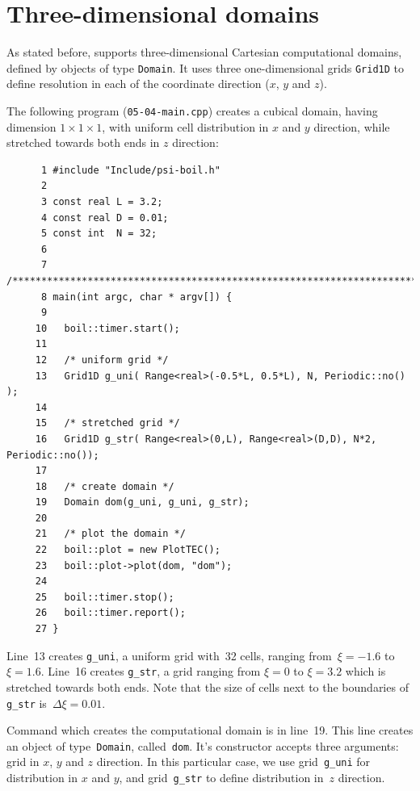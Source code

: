 \section{Three-dimensional domains}
\label{sec_domains}

As stated before, {\psiboil} supports three-dimensional Cartesian
computational domains, defined by objects of type {\tt Domain}. 
It uses three one-dimensional grids {\tt Grid1D} to define 
resolution in each of the coordinate direction ($x$, $y$ and $z$).

The following program ({\tt 05-04-main.cpp}) creates a cubical domain, 
having dimension $1 \times 1 \times 1$, with uniform cell distribution 
in $x$ and $y$ direction, while stretched towards both ends in $z$ 
direction: 
%
{\small \begin{verbatim}
      1 #include "Include/psi-boil.h"
      2
      3 const real L = 3.2;
      4 const real D = 0.01;
      5 const int  N = 32;
      6
      7 /****************************************************************************/
      8 main(int argc, char * argv[]) {
      9
     10   boil::timer.start();
     11
     12   /* uniform grid */
     13   Grid1D g_uni( Range<real>(-0.5*L, 0.5*L), N, Periodic::no() );
     14
     15   /* stretched grid */
     16   Grid1D g_str( Range<real>(0,L), Range<real>(D,D), N*2, Periodic::no());
     17
     18   /* create domain */
     19   Domain dom(g_uni, g_uni, g_str);
     20
     21   /* plot the domain */
     22   boil::plot = new PlotTEC();
     23   boil::plot->plot(dom, "dom");
     24
     25   boil::timer.stop();
     26   boil::timer.report();
     27 }
\end{verbatim}}
%
Line~13 creates {\tt g\_uni}, a uniform grid with~32 cells, ranging 
from~$\xi=-1.6$ to $\xi=1.6$. Line~16 creates {\tt g\_str}, a grid ranging from 
$\xi=0$ to $\xi=3.2$ which is stretched towards both ends. Note that the size of
cells next to the boundaries of {\tt g\_str} is~$\Delta \xi = 0.01$. 

Command which creates the computational domain is in line~19. This line creates
an object of type~{\tt Domain}, called~{\tt dom}. It's constructor accepts three
arguments: grid in $x$, $y$ and $z$ direction. In this particular case, we use
grid~{\tt g\_uni} for distribution in $x$ and $y$, and grid~{\tt g\_str} to
define distribution in~$z$ direction.

